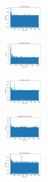 \begin{figure}[H]    
    \centering
    \begin{subfigure}
        \centering
        \includegraphics[width=0.234\textwidth]{img/am01/iris_set_const_20_949004259_time.png}
    \end{subfigure}
    \hfill
    \begin{subfigure}
        \centering
        \includegraphics[width=0.234\textwidth]{img/am01/ecoli_set_const_20_949004259_time.png}
    \end{subfigure}
    \hfill
    \begin{subfigure}
        \centering
        \includegraphics[width=0.234\textwidth]{img/am01/rand_set_const_20_949004259_time.png}
    \end{subfigure}
    \hfill
    \begin{subfigure}
        \centering
        \includegraphics[width=0.234\textwidth]{img/am01/newthyroid_set_const_20_949004259_time.png}
    \end{subfigure}
    \hfill
    \begin{subfigure}
        \centering
        \includegraphics[width=0.234\textwidth]{img/am01/iris_set_const_20_589741062_time.png}
    \end{subfigure}
    \hfill

\end{figure}
